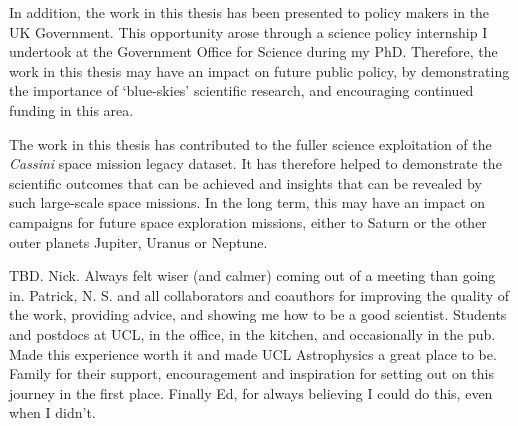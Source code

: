 \begin{impactstatement}
In addition, the work in this thesis has been presented to policy makers in the UK Government. This opportunity arose through a science policy internship I undertook at the Government Office for Science during my PhD. Therefore, the work in this thesis may have an impact on future public policy, by demonstrating the importance of `blue-skies’ scientific research, and encouraging continued funding in this area.

The work in this thesis has contributed to the fuller science exploitation of the \textit{Cassini} space mission legacy dataset. It has therefore helped to demonstrate the scientific outcomes that can be achieved and insights that can be revealed by such large-scale space missions. In the long term, this may have an impact on campaigns for future space exploration missions, either to Saturn or the other outer planets Jupiter, Uranus or Neptune.

\end{impactstatement}


\begin{acknowledgements}
TBD.
Nick. Always felt wiser (and calmer) coming out of a meeting than going in. Patrick, N. S. and all collaborators and coauthors for improving the quality of the work, providing advice, and showing me how to be a good scientist.
Students and postdocs at UCL, in the office, in the kitchen, and occasionally in the pub. Made this experience worth it and made UCL Astrophysics a great place to be.
Family for their support, encouragement and inspiration for setting out on this journey in the first place. Finally Ed, for always believing I could do this, even when I didn't.
\end{acknowledgements}

\setcounter{tocdepth}{2} 

\tableofcontents

\cleardoublepage %
{}

\listoffigures

\cleardoublepage %
{}

\listoftables

